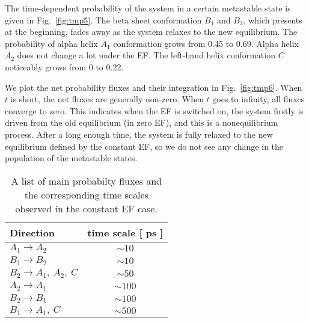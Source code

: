 \documentclass[a4paper,preprint,unsortedaddress,onecolumn]{revtex4-1}
\begin{document}
The time-dependent probability of the system in a certain metastable state is given in
Fig.~\ref{fig:tmp5}. The beta sheet conformation $B_1$ and $B_2$,
which presents at the beginning,
fades away as the system relaxes to the new equilibrium. The
probability of alpha helix $A_1$ conformation grows from 0.45 to 0.69.
Alpha helix $A_2$  does not change a lot under the EF.
The left-hand helix conformation $C$ noticeably grows from 0 to 0.22.

We plot the net probability fluxes and their integration in Fig.~\ref{fig:tmp6}.
When $t$ is short, the net fluxes are generally non-zero.
When $t$ goes to infinity,
all fluxes converge to zero. This indicates
when the EF is switched on, the system firstly is driven from the old
equilibrium (in zero EF), and this is a nonequilibrium process.
After a long enough time, the system
is fully relaxed to the new equilibrium defined by the constant EF,
so we do not see any change
in the population of the metastable states.

\begin{table}
  \centering
  \begin{tabular*}{0.4\textwidth}{@{\extracolsep{\fill}}lc}\hline\hline
    Direction        & time scale [ ps ] \\\hline
    $A_1\rightarrow A_2$        &       $\sim 10$      \\
    $B_1\rightarrow B_2$        &       $\sim 10$      \\    
    $B_2\rightarrow A_1,\ A_2,\ C$        &       $\sim 50$      \\    
    $A_2\rightarrow A_1$        &       $\sim 100$      \\
    $B_2\rightarrow B_1$        &       $\sim 100$      \\    
    $B_1\rightarrow A_1,\ C$        &       $\sim 500$      \\    \hline\hline
  \end{tabular*}
  \caption{A list of main probabilty fluxes and the corresponding time scales observed in the constant EF case.}
  \label{tab:tmp1}
\end{table}
\end{document}
